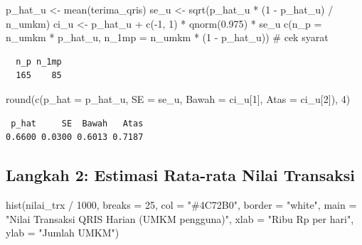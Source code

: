 \documentclass[
  indonesian,
  letterpaper,
]{book}
\newenvironment{Shaded}{\begin{snugshade}}{\end{snugshade}}
\newcommand{\AttributeTok}[1]{\textcolor[rgb]{0.40,0.45,0.13}{#1}}
\newcommand{\CommentTok}[1]{\textcolor[rgb]{0.37,0.37,0.37}{#1}}
\newcommand{\DecValTok}[1]{\textcolor[rgb]{0.68,0.00,0.00}{#1}}
\newcommand{\FloatTok}[1]{\textcolor[rgb]{0.68,0.00,0.00}{#1}}
\newcommand{\FunctionTok}[1]{\textcolor[rgb]{0.28,0.35,0.67}{#1}}
\newcommand{\NormalTok}[1]{\textcolor[rgb]{0.00,0.23,0.31}{#1}}
\newcommand{\OtherTok}[1]{\textcolor[rgb]{0.00,0.23,0.31}{#1}}
\newcommand{\SpecialCharTok}[1]{\textcolor[rgb]{0.37,0.37,0.37}{#1}}
\newcommand{\StringTok}[1]{\textcolor[rgb]{0.13,0.47,0.30}{#1}}
\begin{document}
\begin{Shaded}
\begin{Highlighting}[]
\NormalTok{p\_hat\_u }\OtherTok{\textless{}{-}} \FunctionTok{mean}\NormalTok{(terima\_qris)}
\NormalTok{se\_u }\OtherTok{\textless{}{-}} \FunctionTok{sqrt}\NormalTok{(p\_hat\_u }\SpecialCharTok{*}\NormalTok{ (}\DecValTok{1} \SpecialCharTok{{-}}\NormalTok{ p\_hat\_u) }\SpecialCharTok{/}\NormalTok{ n\_umkm)}
\NormalTok{ci\_u }\OtherTok{\textless{}{-}}\NormalTok{ p\_hat\_u }\SpecialCharTok{+} \FunctionTok{c}\NormalTok{(}\SpecialCharTok{{-}}\DecValTok{1}\NormalTok{, }\DecValTok{1}\NormalTok{) }\SpecialCharTok{*} \FunctionTok{qnorm}\NormalTok{(}\FloatTok{0.975}\NormalTok{) }\SpecialCharTok{*}\NormalTok{ se\_u}
\FunctionTok{c}\NormalTok{(}\AttributeTok{n\_p =}\NormalTok{ n\_umkm }\SpecialCharTok{*}\NormalTok{ p\_hat\_u, }\AttributeTok{n\_1mp =}\NormalTok{ n\_umkm }\SpecialCharTok{*}\NormalTok{ (}\DecValTok{1} \SpecialCharTok{{-}}\NormalTok{ p\_hat\_u))   }\CommentTok{\# cek syarat}
\end{Highlighting}
\end{Shaded}

\begin{verbatim}
  n_p n_1mp 
  165    85 
\end{verbatim}

\begin{Shaded}
\begin{Highlighting}[]
\FunctionTok{round}\NormalTok{(}\FunctionTok{c}\NormalTok{(}\AttributeTok{p\_hat =}\NormalTok{ p\_hat\_u, }\AttributeTok{SE =}\NormalTok{ se\_u, }\AttributeTok{Bawah =}\NormalTok{ ci\_u[}\DecValTok{1}\NormalTok{], }\AttributeTok{Atas =}\NormalTok{ ci\_u[}\DecValTok{2}\NormalTok{]), }\DecValTok{4}\NormalTok{)}
\end{Highlighting}
\end{Shaded}

\begin{verbatim}
 p_hat     SE  Bawah   Atas 
0.6600 0.0300 0.6013 0.7187 
\end{verbatim}

\subsection{Langkah 2: Estimasi Rata-rata Nilai
Transaksi}\label{langkah-2-estimasi-rata-rata-nilai-transaksi}

\begin{Shaded}
\begin{Highlighting}[]
\FunctionTok{hist}\NormalTok{(nilai\_trx }\SpecialCharTok{/} \DecValTok{1000}\NormalTok{, }\AttributeTok{breaks =} \DecValTok{25}\NormalTok{, }\AttributeTok{col =} \StringTok{"\#4C72B0"}\NormalTok{, }\AttributeTok{border =} \StringTok{"white"}\NormalTok{,}
     \AttributeTok{main =} \StringTok{"Nilai Transaksi QRIS Harian (UMKM pengguna)"}\NormalTok{, }\AttributeTok{xlab =} \StringTok{"Ribu Rp per hari"}\NormalTok{,}
     \AttributeTok{ylab =} \StringTok{"Jumlah UMKM"}\NormalTok{)}
\end{Highlighting}
\end{Shaded}
\end{document}
